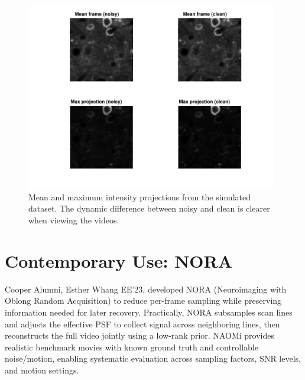 \documentclass[conference]{IEEEtran}
\begin{document}
\begin{figure}[t]
  \centering
  \includegraphics[width=0.98\textwidth]{meanAndMaxImages.pdf}
  \caption{Mean and maximum intensity projections from the simulated dataset. The dynamic difference between noisy and clean is clearer when viewing the videos.}
  \label{fig:meanmax}
\end{figure}

\section{Contemporary Use: NORA}\label{sec:nora}
Cooper Alumni, Esther Whang EE'23, developed NORA (Neuroimaging with Oblong Random Acquisition) to reduce per-frame sampling while preserving information needed for later recovery. Practically, NORA subsamples scan lines and adjusts the effective PSF to collect signal across neighboring lines, then reconstructs the full video jointly using a low-rank prior. NAOMi provides realistic benchmark movies with known ground truth and controllable noise/motion, enabling systematic evaluation across sampling factors, SNR levels, and motion settings.
\end{document}
